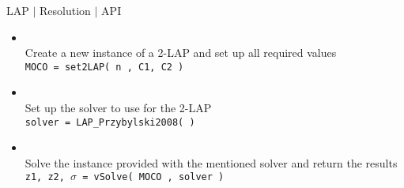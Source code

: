 %
% 
\begin{frame}{LAP $\mid$ Resolution $\mid$ API}

\begin{itemize}
\item  {}\\
          Create a new instance of a 2-LAP and set up all required values    \\
           \texttt{MOCO = \texttt{{set2}LAP( n , C1, C2 ) }} 
           \medskip
\item  {} \\
          Set up the solver to use for the 2-LAP\\
          \texttt{solver = LAP\_Przybylski2008( ) }
          \medskip
\item  {}\\
          Solve the instance provided with the mentioned solver and return the results \\
          \texttt{z1, z2, $\sigma$ = vSolve( MOCO , solver ) }
\end{itemize}

\end{frame}

